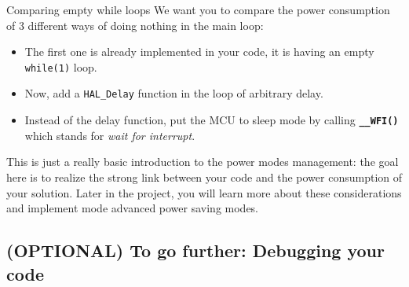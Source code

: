 \begin{bclogo}[couleur = gray!20, arrondi = 0.2, logo=\bcquestion]{Comparing empty while loops}
We want you to compare the power consumption of 3 different ways of doing nothing in the main loop:
\begin{itemize}
    \item The first one is already implemented in your code, it is having an empty \texttt{while(1)} loop.
    \item Now, add a \texttt{HAL\_Delay} function in the loop of arbitrary delay.
    \item Instead of the delay function, put the MCU to sleep mode by calling \texttt{\textbf{\_\_WFI()}} which stands for \textit{wait for interrupt}.
\end{itemize}

This is just a really basic introduction to the power modes management: the goal here is to realize the strong link between your code and the power consumption of your solution. Later in the project, you will learn more about these considerations and implement mode advanced power saving modes.

\end{bclogo}
\subsection{(OPTIONAL) To go further: Debugging your code}

